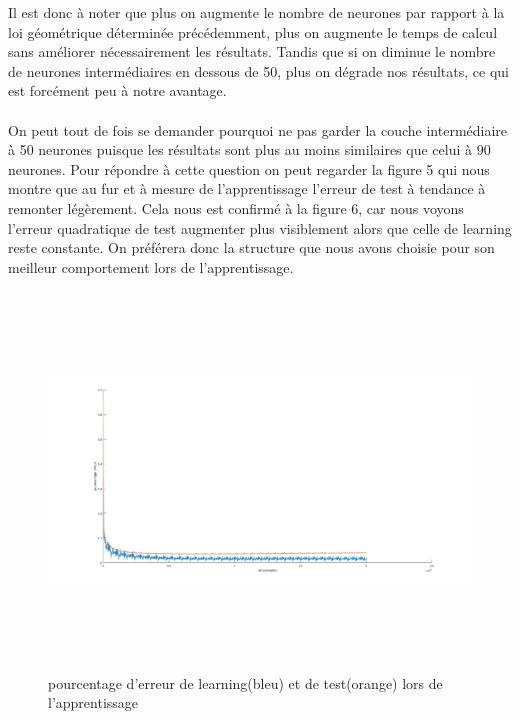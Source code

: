 \documentclass[a4paper,oneside]{report}
\begin{document}
Il est donc à noter que plus on augmente le nombre de neurones par rapport à la loi géométrique déterminée précédemment, plus on augmente le temps de calcul sans améliorer nécessairement les résultats. Tandis que si on diminue le nombre de neurones intermédiaires en dessous de 50, plus on dégrade nos résultats, ce qui est forcément peu à notre avantage.

\newpage
\paragraph{}
On peut tout de fois se demander pourquoi ne pas garder la couche intermédiaire à 50 neurones puisque les résultats sont plus au moins similaires que celui à 90 neurones. Pour répondre à cette question on peut regarder la figure 5 qui nous montre que au fur et à mesure de l'apprentissage l'erreur de test à tendance à remonter légèrement. Cela nous est confirmé à la figure 6, car nous voyons l'erreur quadratique de test augmenter plus visiblement alors que celle de learning reste constante. On préférera donc la structure que nous avons choisie pour son meilleur comportement lors de l'apprentissage.
\begin{figure}[!h]
	\begin{center}
		\includegraphics[width=17cm,height=10cm]{Images/courbes3couches50.jpg} 
		\caption{pourcentage d'erreur de learning(bleu) et de test(orange) lors de l'apprentissage} 
	\end{center}
\end{figure}
\end{document}

